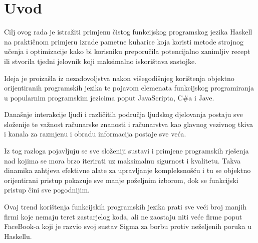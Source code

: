 \chapter{Uvod}

Cilj ovog rada je istražiti primjenu čistog funkcijskog programskog jezika Haskell na praktičnom primjeru izrade pametne kuharice koja koristi metode strojnog učenja i optimizacije kako bi korisniku preporučila potencijalno zanimljiv recept ili stvorila tjedni jelovnik koji maksimalno iskorištava sastojke.

Ideja je proizašla iz nezadovoljstva nakon višegodišnjeg korištenja objektno orijentiranih programskih jezika te pojavom elemenata funkcijskog programiranja u popularnim programskim jezicima poput JavaScripta, C\#a i Jave.

Današnje interakcije ljudi i različitih područja ljudskog djelovanja postaju sve složenije te važnost računarske znanosti i računarstva kao glavnog vezivnog tkiva i kanala za razmjenu i obradu informacija postaje sve veća.

Iz tog razloga pojavljuju se sve složeniji sustavi i primjene programskih rješenja nad kojima se mora brzo iterirati uz maksimalnu sigurnost i kvalitetu. Takva dinamika zahtjeva efektivne alate za upravljanje kompleksnošću i tu se objektno orijentirani pristup pokazuje sve manje poželjnim izborom, dok se funkcijski pristup čini sve pogodnijim.

Ovaj trend korištenja funkcijskih programskih jezika prati sve veći broj manjih firmi koje nemaju teret zastarjelog  koda, ali ne zaostaju niti veće firme poput FaceBook-a koji je razvio svoj sustav Sigma\cite{sigma} za borbu protiv neželjenih poruka  u Haskellu.
